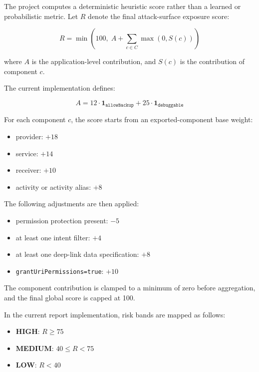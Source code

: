 \documentclass[preprint,12pt,a4paper]{elsarticle}
\begin{document}
The project computes a deterministic heuristic score rather than a learned or probabilistic metric. Let $R$ denote the final attack-surface exposure score:

\begin{equation}
R = \min \left(100,\; A + \sum_{c \in C}\max(0,S(c)) \right)
\end{equation}

where $A$ is the application-level contribution, and $S(c)$ is the contribution of component $c$.

The current implementation defines:

\begin{equation}
A = 12 \cdot \mathbf{1}_{\texttt{allowBackup}} + 25 \cdot \mathbf{1}_{\texttt{debuggable}}
\end{equation}

For each component $c$, the score starts from an exported-component base weight:

\begin{itemize}[leftmargin=*]
\item provider: $+18$
\item service: $+14$
\item receiver: $+10$
\item activity or activity alias: $+8$
\end{itemize}

The following adjustments are then applied:

\begin{itemize}[leftmargin=*]
\item permission protection present: $-5$
\item at least one intent filter: $+4$
\item at least one deep-link data specification: $+8$
\item \texttt{grantUriPermissions=true}: $+10$
\end{itemize}

The component contribution is clamped to a minimum of zero before aggregation, and the final global score is capped at 100.

In the current report implementation, risk bands are mapped as follows:

\begin{itemize}[leftmargin=*]
\item \textbf{HIGH}: $R \geq 75$
\item \textbf{MEDIUM}: $40 \leq R < 75$
\item \textbf{LOW}: $R < 40$
\end{itemize}
\end{document}
